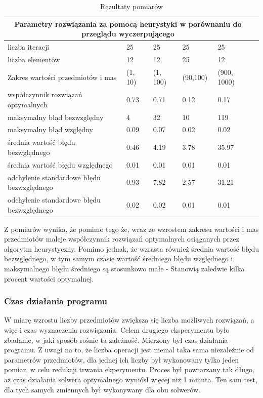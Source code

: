     \begin{table}[h!]
    	\centering
    	\begin{tabular}{ |p{4cm}||p{2cm}|p{2cm}|p{2cm}|p{2cm}|p{2cm}| }
    		
    		\hline
    		\multicolumn{5}{|c|}{Parametry rozwiązania za pomocą heurystyki w porównaniu do przeglądu wyczerpującego} \\
    		\hline
    		liczba iteracji & 25 & 25 & 25 & 25 \\
    		\hline
    		liczba elementów & 12 & 12 & 25 & 12 \\
    		\hline
        	Zakres wartości przedmiotów i mas & (1, 10) & (1, 100) & (90,100) & (900, 1000) \\
    		\hline
    		współczynnik rozwiązań optymalnych & 0.73 & 0.71 & 0.12 & 0.17 \\
    		\hline
    		maksymalny błąd bezwzględny & 4 & 32 & 10 & 119 \\
    		\hline
    		maksymalny błąd względny & 0.09 & 0.07 & 0.02 & 0.02 \\
    		\hline
    		średnia wartość błędu bezwględnego & 0.46 & 4.19 & 3.78 & 35.97 \\
    		\hline
    		średnia wartość błędu względnego & 0.01 & 0.01 & 0.01 & 0.01 \\
    		\hline
    		odchylenie standardowe błędu bezwzględnego & 0.93 & 7.82 & 2.57 & 31.21 \\
    		\hline
    		odchylenie standardowe błędu bezwzględnego & 0.02 & 0.02 & 0.01 & 0.01 \\
    		\hline
    	\end{tabular}
    	\caption{Rezultaty pomiarów}
    \end{table}
	Z pomiarów wynika, że pomimo tego że, wraz ze wzrostem zakresu wartości i mas przedmiotów maleje współczynnik rozwiązań optymalnych osiąganych przez algorytm heurystyczny. Pomimo jednak, że wzrasta również średnia wartość błędu bezwględnego, w tym samym czasie wartość średniego błędu względnego i maksymalnego błędu średniego są stosunkowo małe - Stanowią zaledwie kilka procent wartości optymalnej. 
    \subsubsection{Czas działania programu}
    W miarę wzrostu liczby przedmiotów zwiększa się liczba możliwych rozwiązań, a więc i czas wyznaczenia rozwiązania. Celem drugiego eksperymentu było zbadanie, w jaki sposób rośnie ta zależność. Mierzony był czas działania programu. Z uwagi na to, że liczba operacji jest niemal taka sama niezależnie od parametrów przedmiotów, dla jednej ich liczby był wykonowany tylko jeden pomiar, w celu redukcji trwania ekperymentu. Proces był powtarzany tak długo, aż czas działania solwera optymalnego wyniósł więcej niż 1 minuta. Ten sam test, dla tych samych zmiennych był wykonywany dla obu solwerów.
    
